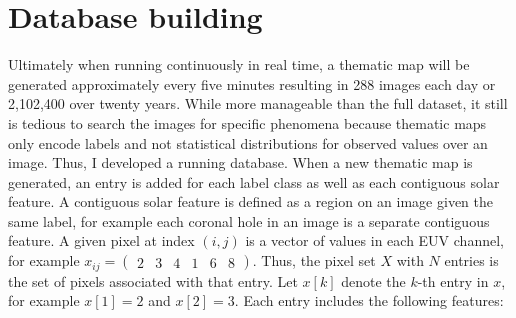 \documentclass[twoside]{report}
\begin{document}
\section{Database building} \label{sec:database}
Ultimately when running continuously in real time, a thematic map will be generated approximately every five minutes resulting in 288 images each day or 2,102,400 over twenty years. While more manageable than the full dataset, it still is tedious to search the images for specific phenomena because thematic maps only encode labels and not statistical distributions for observed values over an image. Thus, I developed a running database. When a new thematic map is generated, an entry is added for each label class as well as each contiguous solar feature. A contiguous solar feature is defined as a region on an image given the same label, for example each coronal hole in an image is a separate contiguous feature. A given pixel at index $(i,j)$ is a vector of values in each EUV channel, for example $x_{ij} = \begin{pmatrix}2 &  3 & 4 & 1 & 6 & 8 \end{pmatrix}$. Thus, the pixel set $X$ with $N$ entries is the set of pixels associated with that entry. Let $x[k]$ denote the $k$-th entry in $x$, for example $x[1] = 2$ and $x[2] = 3$. Each entry includes the following features:
\end{document}
